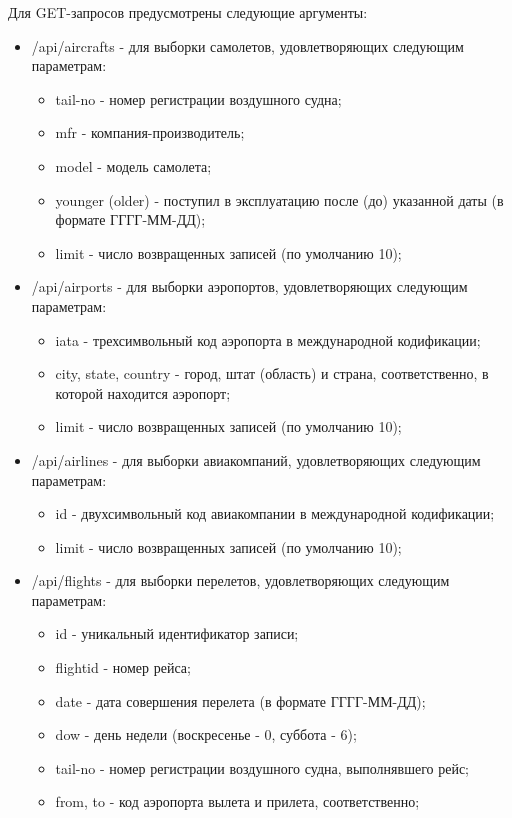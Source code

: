 Для GET-запросов предусмотрены следующие аргументы:
\begin{itemize}
	\item /api/aircrafts - для выборки самолетов, удовлетворяющих следующим параметрам:
	\begin{itemize}
		\item tail-no - номер регистрации воздушного судна;
		\item mfr - компания-производитель;
		\item model - модель самолета;
		\item younger (older) -  поступил в эксплуатацию после (до) указанной даты (в формате ГГГГ-ММ-ДД);
		\item limit - число возвращенных записей (по умолчанию 10);
	\end{itemize}
	\item /api/airports - для выборки аэропортов, удовлетворяющих следующим параметрам:
	\begin{itemize}
		\item iata - трехсимвольный код аэропорта в международной кодификации;
		\item city, state, country - город, штат (область) и страна, соответственно, в которой находится аэропорт;
		\item limit - число возвращенных записей (по умолчанию 10);
	\end{itemize}
	\item /api/airlines - для выборки авиакомпаний, удовлетворяющих следующим параметрам:
	\begin{itemize}
		\item id - двухсимвольный код авиакомпании в международной кодификации;
		\item limit - число возвращенных записей (по умолчанию 10);
	\end{itemize}
	\item /api/flights - для выборки перелетов, удовлетворяющих следующим параметрам:
	\begin{itemize}
		\item id - уникальный идентификатор записи;
		\item flightid - номер рейса;
		\item date - дата совершения перелета (в формате ГГГГ-ММ-ДД);
		\item dow - день недели (воскресенье - 0, суббота - 6);
		\item tail-no - номер регистрации воздушного судна, выполнявшего рейс;
		\item from, to - код аэропорта вылета и прилета, соответственно;

\end{itemize}
\end{itemize}
